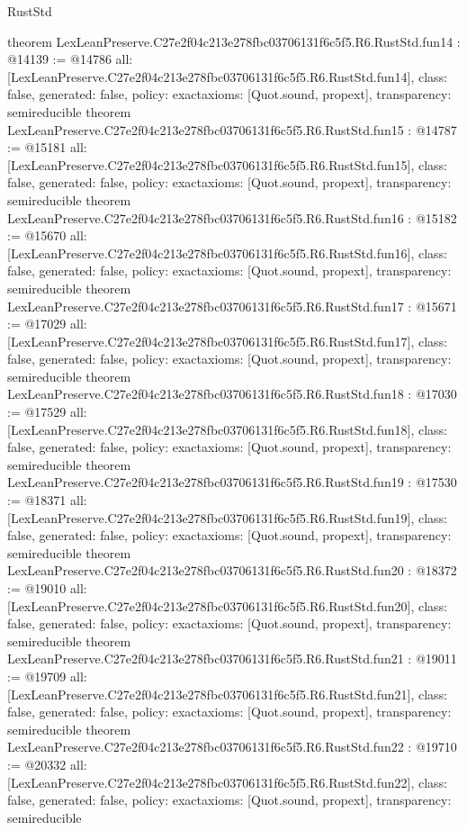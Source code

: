 \begin{lexlean}{RustStd}
\begin{coremodule}
{}
theorem LexLeanPreserve.C27e2f04c213e278fbc03706131f6c5f5.R6.RustStd.fun14 : @14139 := @14786 {
  all: [LexLeanPreserve.C27e2f04c213e278fbc03706131f6c5f5.R6.RustStd.fun14],
  class: false,
  generated: false,
  policy: exact{axioms: [Quot.sound, propext]},
  transparency: semireducible
}
theorem LexLeanPreserve.C27e2f04c213e278fbc03706131f6c5f5.R6.RustStd.fun15 : @14787 := @15181 {
  all: [LexLeanPreserve.C27e2f04c213e278fbc03706131f6c5f5.R6.RustStd.fun15],
  class: false,
  generated: false,
  policy: exact{axioms: [Quot.sound, propext]},
  transparency: semireducible
}
theorem LexLeanPreserve.C27e2f04c213e278fbc03706131f6c5f5.R6.RustStd.fun16 : @15182 := @15670 {
  all: [LexLeanPreserve.C27e2f04c213e278fbc03706131f6c5f5.R6.RustStd.fun16],
  class: false,
  generated: false,
  policy: exact{axioms: [Quot.sound, propext]},
  transparency: semireducible
}
theorem LexLeanPreserve.C27e2f04c213e278fbc03706131f6c5f5.R6.RustStd.fun17 : @15671 := @17029 {
  all: [LexLeanPreserve.C27e2f04c213e278fbc03706131f6c5f5.R6.RustStd.fun17],
  class: false,
  generated: false,
  policy: exact{axioms: [Quot.sound, propext]},
  transparency: semireducible
}
theorem LexLeanPreserve.C27e2f04c213e278fbc03706131f6c5f5.R6.RustStd.fun18 : @17030 := @17529 {
  all: [LexLeanPreserve.C27e2f04c213e278fbc03706131f6c5f5.R6.RustStd.fun18],
  class: false,
  generated: false,
  policy: exact{axioms: [Quot.sound, propext]},
  transparency: semireducible
}
theorem LexLeanPreserve.C27e2f04c213e278fbc03706131f6c5f5.R6.RustStd.fun19 : @17530 := @18371 {
  all: [LexLeanPreserve.C27e2f04c213e278fbc03706131f6c5f5.R6.RustStd.fun19],
  class: false,
  generated: false,
  policy: exact{axioms: [Quot.sound, propext]},
  transparency: semireducible
}
theorem LexLeanPreserve.C27e2f04c213e278fbc03706131f6c5f5.R6.RustStd.fun20 : @18372 := @19010 {
  all: [LexLeanPreserve.C27e2f04c213e278fbc03706131f6c5f5.R6.RustStd.fun20],
  class: false,
  generated: false,
  policy: exact{axioms: [Quot.sound, propext]},
  transparency: semireducible
}
theorem LexLeanPreserve.C27e2f04c213e278fbc03706131f6c5f5.R6.RustStd.fun21 : @19011 := @19709 {
  all: [LexLeanPreserve.C27e2f04c213e278fbc03706131f6c5f5.R6.RustStd.fun21],
  class: false,
  generated: false,
  policy: exact{axioms: [Quot.sound, propext]},
  transparency: semireducible
}
theorem LexLeanPreserve.C27e2f04c213e278fbc03706131f6c5f5.R6.RustStd.fun22 : @19710 := @20332 {
  all: [LexLeanPreserve.C27e2f04c213e278fbc03706131f6c5f5.R6.RustStd.fun22],
  class: false,
  generated: false,
  policy: exact{axioms: [Quot.sound, propext]},
  transparency: semireducible
}
\end{coremodule}
\end{lexlean}
